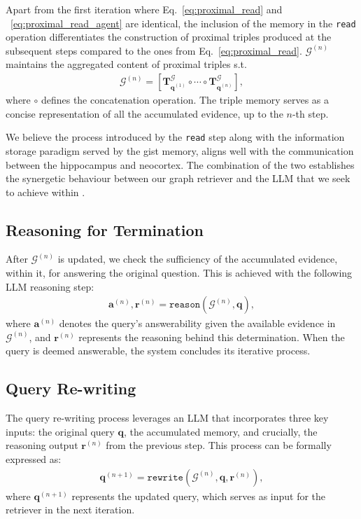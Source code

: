 Apart from the first iteration where Eq.~\ref{eq:proximal_read} and ~\ref{eq:proximal_read_agent} are identical, the inclusion of the memory in the \texttt{read} operation differentiates the construction of proximal triples produced at the subsequent steps compared to the ones from Eq.~\ref{eq:proximal_read}. $\mathcal{G}^{(n)}$ maintains the aggregated content of proximal triples s.t. 
\begin{align}
\mathcal{G}^{(n)} = \left[ \mathbf{T}_{\mathbf{q}^{(1)}}^{\mathcal{G}}  \circ \cdots \circ \mathbf{T}_{\mathbf{q}^{(n)}}^{\mathcal{G}} \right],
\end{align}where $\circ$ defines the concatenation operation. The triple memory serves as a concise representation of all the accumulated evidence, up to the $n$-th step. 

We believe the process introduced by the \texttt{read} step along with the information storage paradigm served by the gist memory, aligns well with the communication between the hippocampus and neocortex. The combination of the two establishes the synergetic behaviour between our graph retriever and the LLM that we seek to achieve within \gear.



\subsection{Reasoning for Termination}
After $\mathcal{G}^{(n)}$ is updated, we check the sufficiency of the accumulated evidence, within it, for answering the original question. This is achieved with the following LLM reasoning step:
\begin{align}
\mathbf{a}^{(n)}, \mathbf{r}^{(n)}   = \texttt{reason}(\mathcal{G}^{(n)}, \mathbf{q}),
\end{align}
where $\mathbf{a}^{(n)}$ denotes the query's answerability given the available evidence in $\mathcal{G}^{(n)}$, and $\mathbf{r}^{(n)}$ represents the reasoning behind this determination. When the query is deemed answerable, the system concludes its iterative process.



\subsection{Query Re-writing}
The query re-writing process leverages an LLM that incorporates three key inputs: the original query $\mathbf{q}$, the accumulated memory, and crucially, the reasoning output $\mathbf{r}^{(n)}$ from the previous step. This process can be formally expressed as:
\begin{align}
\mathbf{q}^{(n+1)} = \texttt{rewrite}\left (\mathcal{G}^{(n)}, \mathbf{q}, \mathbf{r}^{(n)} \right),
\end{align}
where $\mathbf{q}^{(n+1)}$ represents the updated query, which serves as input for the retriever in the next iteration.\\
